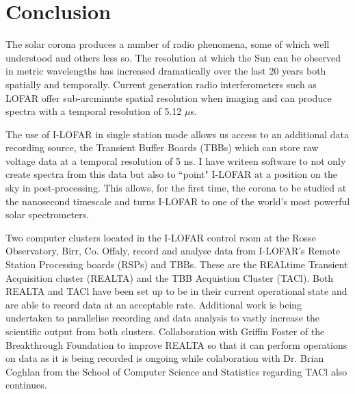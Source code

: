\onehalfspacing
\chapter{Conclusion}
\label{chap:conc}
The solar corona produces a number of radio phenomena, some of which well understood and others less so. The resolution at which the Sun can be observed in metric wavelengths has increased dramatically over the last 20 years both spatially and temporally. Current generation radio interferometers such as LOFAR offer sub-arcminute spatial resolution when imaging and can produce spectra with a temporal resolution of 5.12 $\mu$s. 

The use of I-LOFAR in single station mode allows us access to an additional data recording source, the Transient Buffer Boards (TBBs) which can store raw voltage data at a temporal resolution of 5 ns. I have writeen software to not only create spectra from this data but also to ``point" I-LOFAR at a position on the sky in post-processing. This allows, for the first time, the corona to be studied at the nanosecond timescale and turns I-LOFAR to one of the world's most powerful solar spectrometers. 

Two computer clusters located in the I-LOFAR control room at the Rosse Observatory, Birr, Co. Offaly, record and analyse data from I-LOFAR's Remote Station Processing boards (RSPs) and TBBs. These are the REALtime Transient Acquisition cluster (REALTA) and the TBB Acquistion Cluster (TACl). Both REALTA and TACl have been set up to be in their current operational state and are able to record data at an acceptable rate. Additional work is being undertaken to parallelise recording and data analysis to vastly increase the scientific output from both clusters. Collaboration with Griffin Foster of the Breakthrough Foundation to improve REALTA so that it can perform operations on data as it is being recorded is ongoing while colaboration with Dr. Brian Coghlan from the School of Computer Science and Statistics regarding TACl also continues.

